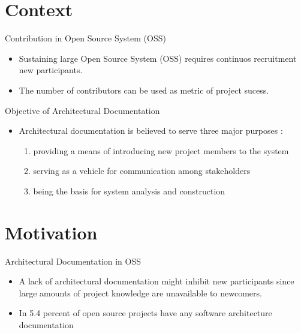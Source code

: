 \documentclass[t,14pt,mathserif]{beamer}
\begin{document}
\section{Context}

\begin{frame}{Contribution in Open Source System (OSS)}
  \begin{itemize}
  \item Sustaining large \alert{Open Source System (OSS)} requires continuos
  recruitment new participants.
  \item The number of contributors can be used as metric of project sucess.  
  \end{itemize}
\end{frame}

\begin{frame}{Objective of Architectural Documentation}
	
	\begin{itemize}
		\item Architectural documentation is believed to serve three major purposes  \cite{clements2002documenting}:		
		\begin{enumerate}
			\item providing a means of introducing new project members to the system
			\item serving as a vehicle for communication among stakeholders
			\item being the basis for system analysis and construction
		\end{enumerate}
	\end{itemize}
	
\end{frame}


\section{Motivation}

\begin{frame}{Architectural Documentation in OSS}
	
	\begin{itemize}
		\item A lack of architectural documentation might inhibit new participants since large amounts of project knowledge are unavailable to newcomers.
		\item In 5.4 percent of open source projects have any software architecture documentation \cite{6923128}
	\end{itemize}
	
\end{frame}
\end{document}
